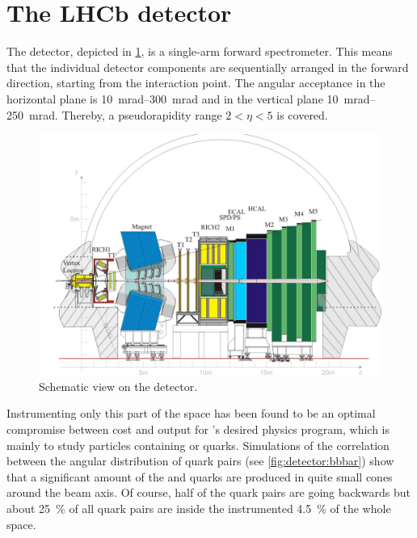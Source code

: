 
\section{The LHCb detector}
\label{sec:detector:lhcb}

The \lhcb detector, depicted in \cref{fig:detector:scheme}, is a single-arm
forward spectrometer. This means that the individual detector
components are sequentially arranged in the forward direction, starting from
the interaction point. The angular acceptance in the horizontal plane is
\SIrange{10}{300}{mrad} and in the vertical plane \SIrange{10}{250}{mrad}.
Thereby, a pseudorapidity range $2<\eta <5$ is covered.
\begin{figure}[htb]
\centering
\includegraphics[width=\textwidth]{04-Detector/figs/Lhcbdetektor.pdf}
\caption{Schematic view on the \lhcb detector\cite{Alves:2008zz}.}
\label{fig:detector:scheme}
\end{figure}
Instrumenting only this part of the space has been found to be an optimal
compromise between cost and output for \lhcb's desired physics program, which
is mainly to study particles containing \bquark or \cquark quarks. Simulations
of the correlation between the angular distribution of \bbbar quark pairs (see
\cref{fig:detector:bbbar}) show that a significant amount of the \bquark and
\bquarkbar quarks are produced in quite small cones around the beam axis. Of
course, half of the \bbbar quark pairs are going backwards but about
\SI{25}{\percent} of all \bbbar quark pairs are inside the instrumented
\SI{4.5}{\percent} of the whole space.

